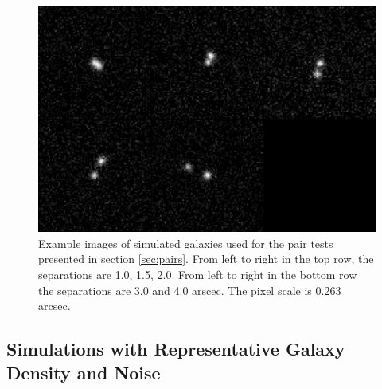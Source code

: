 \documentclass[fleqn,useAMS,usenatbib]{mnras}
\begin{document}
\begin{figure}
    \includegraphics[width=\textwidth]{figures/bdk-comb.png}

    \caption{ Example images of simulated galaxies used for the pair tests
    presented in section \ref{sec:pairs}.  From left to right in the top row,
    the separations are 1.0, 1.5, 2.0. From left to right in the bottom row the
    separations are 3.0 and 4.0 arscec. The pixel scale is 0.263 arcsec.
    \label{fig:pairs} }

\end{figure}


\subsection{Simulations with Representative Galaxy Density and Noise}
\end{document}
